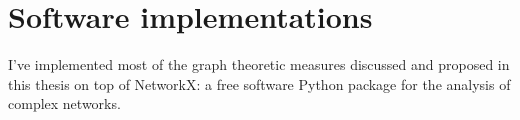 
\chapter{Software implementations}

I've implemented most of the graph theoretic measures discussed and proposed in this thesis on top of NetworkX: a free software Python package for the analysis of complex networks.
